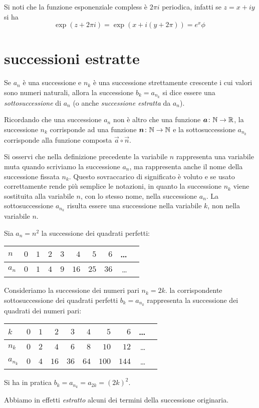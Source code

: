 Si noti che la funzione esponenziale compless è $2\pi i$ periodica, infatti 
se $z=x+iy$ si ha 
\[
\exp(z+2\pi i) 
= \exp(x+i(y+2\pi))  
= e^x\phi\
\]


\section{successioni estratte}

\begin{definition}[sottosuccessione]
\mymark{*}
Se $a_n$ è una successione e $n_k$ è una successione strettamente crescente i cui valori sono numeri naturali, allora la successione
$b_k = a_{n_k}$ si dice essere una \emph{sottosuccessione}%
%
 di $a_n$
(o anche \emph{successione estratta} da $a_n$).
\end{definition}

Ricordando che una successione $a_n$ non è altro che una funzione
$\boldsymbol a\colon {\mathbb N} \to {\mathbb R}$, la successione $n_k$ corrisponde ad una funzione
$\boldsymbol n\colon {\mathbb N} \to {\mathbb N}$ e la sottosuccessione $a_{n_k}$ corrisponde alla
funzione composta $\vec a \circ \vec n$.

Si osservi che nella definizione precedente la variabile $n$ rappresenta
una variabile muta quando scriviamo la successione $a_n$, ma
rappresenta anche il nome della successione fissata $n_k$.
Questo sovraccarico
di significato è voluto e se usato correttamente rende più semplice
le notazioni, in quanto la successione $n_k$ viene sostituita alla
variabile $n$, con lo stesso nome, nella successione $a_n$.
La sottosuccessione $a_{n_k}$ risulta essere una successione nella variabile $k$, non nella variabile $n$.

\begin{example}
Sia $a_n = n^2$ la successione dei quadrati perfetti:
\begin{center}
\begin{tabular}{l|rrrrrrrrr}
$n$   & $0$ & $1$ & $2$ & $3$ & $4$  & $5$  & $6$  & \dots \\ \hline
$a_n$ & $0$ & $1$ & $4$ & $9$ & $16$ & $25$ & $36$ & \dots
\end{tabular}
\end{center}
Consideriamo la successione dei numeri pari $n_k = 2k$.
la corrispondente sottosuccessione dei quadrati perfetti
$b_k = a_{n_k}$
rappresenta la successione dei quadrati dei numeri pari:
\begin{center}
\begin{tabular}{l|rrrrrrrrr}
$k$       & $0$ & $1$ & $2$ & $3$ & $4$  & $5$  & $6$  & \dots \\ \hline
$n_k$ & $0$ & $2$ & $4$ & $6$ & $8$ & $10$ & $12$ & \dots \\
$a_{n_k}$ & $0$ & $4$ & $16$ & $36$ & $64$ & $100$ & $144$ & \dots
\end{tabular}
\end{center}
Si ha in pratica
  $b_k = a_{n_k} = a_{2k} = (2k)^2$.

Abbiamo in effetti \emph{estratto} alcuni dei termini della successione
originaria.
\end{example}

